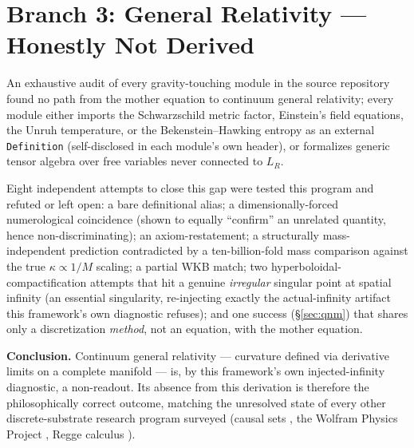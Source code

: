 \documentclass[10pt,twocolumn]{article}
\begin{document}
\section{Branch 3: General Relativity --- Honestly Not Derived}
\label{sec:gr}
An exhaustive audit of every gravity-touching module in the source repository found
no path from the mother equation to continuum general relativity; every module
either imports the Schwarzschild metric factor, Einstein's field equations, the Unruh
temperature, or the Bekenstein--Hawking entropy as an external \texttt{Definition}
(self-disclosed in each module's own header), or formalizes generic tensor algebra
over free variables never connected to $L_R$.

Eight independent attempts to close this gap were tested this program and refuted or
left open: a bare definitional alias; a dimensionally-forced numerological coincidence
(shown to equally ``confirm'' an unrelated quantity, hence non-discriminating); an
axiom-restatement; a structurally mass-independent prediction contradicted by a
ten-billion-fold mass comparison against the true $\kappa\propto1/M$ scaling; a partial
WKB match; two hyperboloidal-compactification attempts that hit a genuine
\emph{irregular} singular point at spatial infinity (an essential singularity,
re-injecting exactly the actual-infinity artifact this framework's own diagnostic
refuses); and one success (\S\ref{sec:qnm}) that shares only a discretization
\emph{method}, not an equation, with the mother equation.

\textbf{Conclusion.} Continuum general relativity --- curvature defined via
derivative limits on a complete manifold --- is, by this framework's own
injected-infinity diagnostic, a non-readout. Its absence from this derivation is
therefore the philosophically correct outcome, matching the unresolved state of every
other discrete-substrate research program surveyed (causal sets \cite{bombelli1987},
the Wolfram Physics Project \cite{wolfram2020}, Regge calculus \cite{regge1961}).
\end{document}
